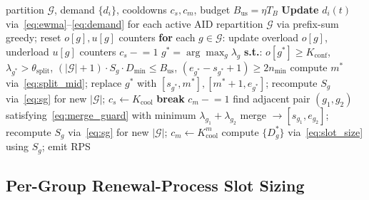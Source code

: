 \documentclass[conference]{IEEEtran}
\begin{document}
\begin{algorithm}[!t]
\caption{TASM-RAW: per-beacon adaptation}
\label{alg:tasm}
\begin{algorithmic}[1]
\Require partition $\mathcal{G}$, demand $\{d_i\}$,
         cooldowns $c_s, c_m$, budget $B_\mathrm{us}\!=\!\eta T_B$
\State \textbf{Update} $d_i(t)$ via~\eqref{eq:ewma}--\eqref{eq:demand}
       for each active AID
  \State repartition $\mathcal{G}$ via prefix-sum greedy;
         reset $o[g], u[g]$ counters
\EndIf
\State \textbf{for} each $g\!\in\!\mathcal{G}$: update overload $o[g]$,
       underload $u[g]$ counters
 $c_s \mathrel{-}= 1$
\Else
    \State $g^*\!=\!\arg\max_g\lambda_g$ \textbf{s.t.}:
      $o[g^*]\!\geq\!K_\mathrm{conf}$,
      $\lambda_{g^*}\!>\!\theta_\mathrm{split}$,
      $(|\mathcal{G}|\!+\!1)\!\cdot\!S_g\!\cdot\!D_\mathrm{min}\!\leq\!B_\mathrm{us}$,
      $(e_{g^*}\!-\!s_{g^*}\!+\!1)\!\geq\!2n_\mathrm{min}$
      \State compute $m^*$ via~\eqref{eq:split_mid};
             replace $g^*$ with $[s_{g^*},m^*],[m^*\!+\!1,e_{g^*}]$;
             recompute $S_g$ via~\eqref{eq:sg} for new $|\mathcal{G}|$;
             $c_s\!\leftarrow\!K_\mathrm{cool}$
    \Else{} \textbf{break}
    \EndIf
  \EndFor
\EndIf
{} $c_m \mathrel{-}= 1$
\Else
  \State find adjacent pair $(g_1,g_2)$ satisfying~\eqref{eq:merge_guard}
         with minimum $\lambda_{g_1}+\lambda_{g_2}$
   merge $\to[s_{g_1},e_{g_2}]$;
             recompute $S_g$ via~\eqref{eq:sg} for new $|\mathcal{G}|$;
             $c_m\!\leftarrow\!K_\mathrm{cool}^m$
  \EndIf
\EndIf
\State compute $\{D_g^*\}$ via~\eqref{eq:slot_size} using $S_g$; emit RPS
\end{algorithmic}
\end{algorithm}

\subsection{Per-Group Renewal-Process Slot Sizing}
\label{sec:bianchi}
\end{document}
